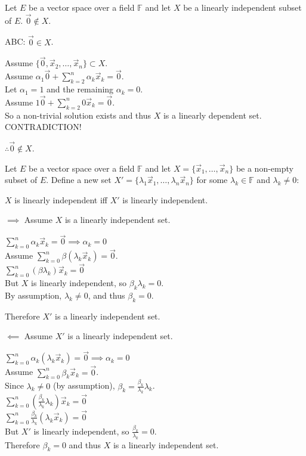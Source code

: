 \documentclass[letterpaper,12pt,fleqn]{article}
\renewcommand{\a}{\alpha}
\renewcommand{\b}{\beta}
\renewcommand{\l}{\lambda}
\newcommand{\F}{\mathbb{F}}
\newcommand{\vx}{\vec{x}}
\newcommand{\vo}{\vec{0}}
\begin{document}
\begin{theorem}
  Let $E$ be a vector space over a field $\F$ and let $X$ be a linearly
  independent subset of $E$. $\vo\notin X$.
\end{theorem}

\begin{theproof}
  ABC: $\vo\in X$.

  Assume $\{\vo,\vx_2,\ldots,\vx_n\}\subset X$. \\
  Assume $\a_1\vo+\sum_{k=2}^n\a_k\vx_k=\vo$. \\
  Let $\a_1=1$ and the remaining $\a_k=0$. \\
  Assume $1\vo+\sum_{k=2}^n0\vx_k=\vo$. \\
  So a non-trivial solution exists and thus $X$ is a linearly dependent set. \\
  CONTRADICTION!

  $\therefore\vo\notin X$.
\end{theproof}

\begin{theorem}
  Let $E$ be a vector space over a field $\F$ and let
  $X=\{\vx_1,\ldots,\vx_n\}$ be a non-empty subset of $E$. Define a new set
  $X'=\{\l_1\vx_1,\ldots,\l_n\vx_n\}$ for some $\l_k\in\F$ and $\l_k\ne0$:

  \qquad$X$ is linearly independent iff $X'$ is linearly independent.
\end{theorem}

\begin{theproof}
  \listbreak
  \begin{description}
  \item $\implies$ Assume $X$ is a linearly independent set.

    $\sum_{k=0}^n\a_k\vx_k=\vo\implies\a_k=0$ \\
    Assume $\sum_{k=0}^n\b(\l_k\vx_k)=\vo$. \\
    $\sum_{k=0}^n(\b\l_k)\vx_k=\vo$ \\
    But $X$ is linearly independent, so $\b_k\l_k=0$. \\
    By assumption, $\l_k\ne0$, and thus $\b_k=0$.

    Therefore $X'$ is a linearly independent set.

  \item $\impliedby$ Assume $X'$ is a linearly independent set.

    $\sum_{k=0}^n\a_k(\l_k\vx_k)=\vo\implies\a_k=0$ \\
    Assume $\sum_{k=0}^n\b_k\vx_k=\vo$. \\
    Since $\l_k\ne0$ (by assumption), $\b_k=\frac{\b_k}{\l_k}\l_k$. \\
    $\sum_{k=0}^n\left(\frac{\b_k}{\l_k}\l_k\right)\vx_k=\vo$ \\
    $\sum_{k=0}^n\frac{\b_k}{\l_k}(\l_k\vx_k)=\vo$ \\
    But $X'$ is linearly independent, so $\frac{\b_k}{\l_k}=0$. \\

    Therefore $\b_k=0$ and thus $X$ is a linearly independent set.
  \end{description}
\end{theproof}
\end{document}
